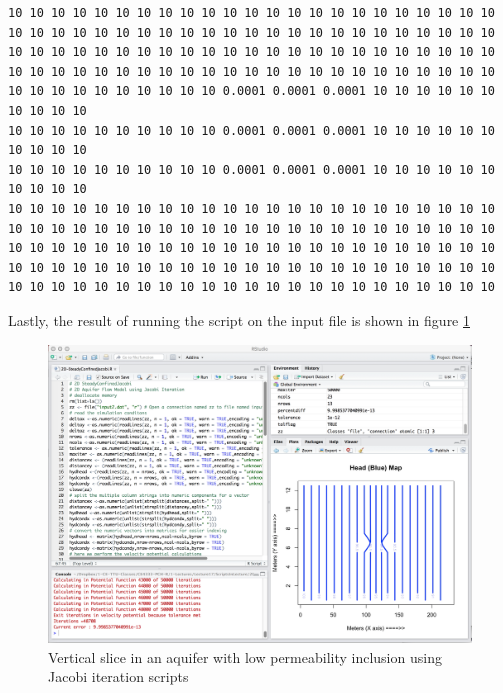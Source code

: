 \begin{lstlisting}[caption= Input file for 2D vertical slice confined aquifer with low permeability inclusion.  The comments in the listing should be removed for running the program , label=lst:2DinclusionInput]
10 10 10 10 10 10 10 10 10 10 10 10 10 10 10 10 10 10 10 10 10 10 10
10 10 10 10 10 10 10 10 10 10 10 10 10 10 10 10 10 10 10 10 10 10 10
10 10 10 10 10 10 10 10 10 10 10 10 10 10 10 10 10 10 10 10 10 10 10
10 10 10 10 10 10 10 10 10 10 10 10 10 10 10 10 10 10 10 10 10 10 10
10 10 10 10 10 10 10 10 10 10 0.0001 0.0001 0.0001 10 10 10 10 10 10 10 10 10 10
10 10 10 10 10 10 10 10 10 10 0.0001 0.0001 0.0001 10 10 10 10 10 10 10 10 10 10
10 10 10 10 10 10 10 10 10 10 0.0001 0.0001 0.0001 10 10 10 10 10 10 10 10 10 10
10 10 10 10 10 10 10 10 10 10 10 10 10 10 10 10 10 10 10 10 10 10 10
10 10 10 10 10 10 10 10 10 10 10 10 10 10 10 10 10 10 10 10 10 10 10
10 10 10 10 10 10 10 10 10 10 10 10 10 10 10 10 10 10 10 10 10 10 10
10 10 10 10 10 10 10 10 10 10 10 10 10 10 10 10 10 10 10 10 10 10 10
10 10 10 10 10 10 10 10 10 10 10 10 10 10 10 10 10 10 10 10 10 10 10
\end{lstlisting}

Lastly, the result of running the script on the input file is shown in figure \ref{fig:LowPInclusionOut}

\begin{figure}[h!] %
   \centering
   \includegraphics[width=5.2in]{./17-SteadyGroundwaterFlow/LowPInclusionOut.jpg} 
   \caption{Vertical slice in an aquifer with low permeability inclusion using Jacobi iteration scripts}
   \label{fig:LowPInclusionOut}
\end{figure}

